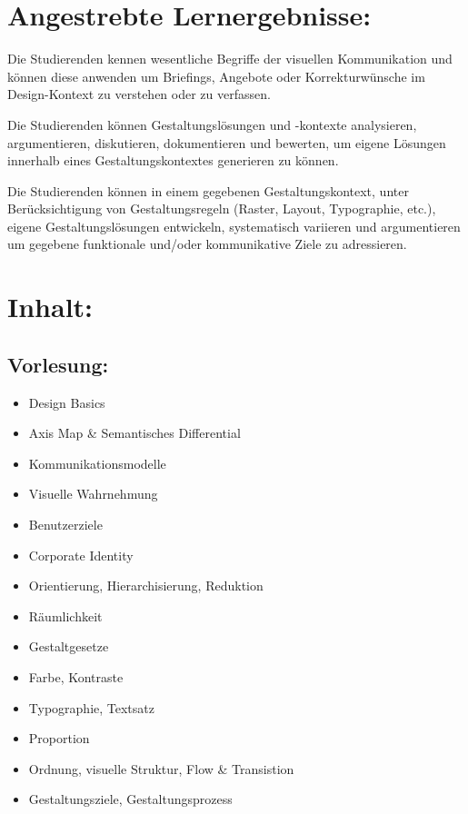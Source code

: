 \section*{Angestrebte
Lernergebnisse:}\label{angestrebte-lernergebnisse-25}

Die Studierenden kennen wesentliche Begriffe der visuellen Kommunikation
und können diese anwenden um Briefings, Angebote oder Korrekturwünsche
im Design-Kontext zu verstehen oder zu verfassen.

Die Studierenden können Gestaltungslösungen und -kontexte analysieren,
argumentieren, diskutieren, dokumentieren und bewerten, um eigene
Lösungen innerhalb eines Gestaltungskontextes generieren zu können.

Die Studierenden können in einem gegebenen Gestaltungskontext, unter
Berücksichtigung von Gestaltungsregeln (Raster, Layout, Typographie,
etc.), eigene Gestaltungslösungen entwickeln, systematisch variieren und
argumentieren um gegebene funktionale und/oder kommunikative Ziele zu
adressieren.

\section*{Inhalt:}\label{inhalt-25}

\subsection*{Vorlesung:}\label{vorlesung}

\begin{itemize}
\item
  Design Basics
\item
  Axis Map \& Semantisches Differential
\item
  Kommunikationsmodelle
\item
  Visuelle Wahrnehmung
\item
  Benutzerziele
\item
  Corporate Identity
\item
  Orientierung, Hierarchisierung, Reduktion
\item
  Räumlichkeit
\item
  Gestaltgesetze
\item
  Farbe, Kontraste
\item
  Typographie, Textsatz
\item
  Proportion
\item
  Ordnung, visuelle Struktur, Flow \& Transistion
\item
  Gestaltungsziele, Gestaltungsprozess
\end{itemize}

